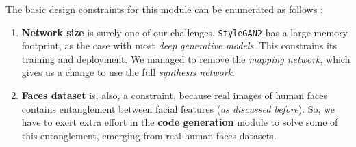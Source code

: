 The basic design constraints for this module can be enumerated as follows :

\begin{enumerate}
    \item \textbf{Network size} is surely one of our challenges. \texttt{StyleGAN2} has a large memory footprint, as the case with most \emph{deep generative models}. This constrains its training and deployment. We managed to remove the \emph{mapping network}, which gives us a change to use the full \emph{synthesis network}.
    \item \textbf{Faces dataset} is, also, a constraint, because real images of human faces contains entanglement between facial features (\emph{as discussed before}). So, we have to exert extra effort in the \textbf{code generation} module to solve some of this entanglement, emerging from real human faces datasets.
\end{enumerate}

